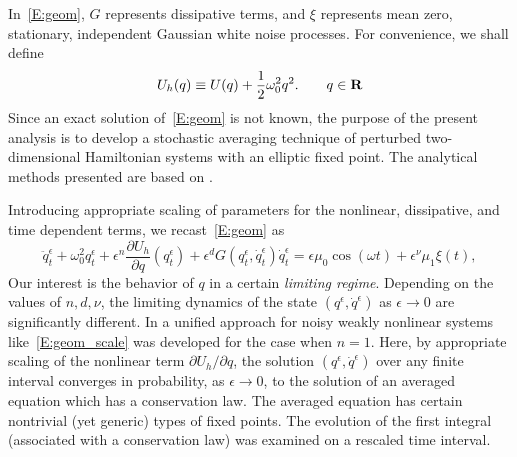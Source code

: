 In~\eqref{E:geom}, $G$ represents dissipative terms, and $\xi$ represents mean zero, stationary, independent Gaussian white noise processes. For convenience, we shall define
\[
U_h(q) \equiv U(q) + \frac12 \omega_0^2 q^2. \qquad q \in \mathbf R
\]
Since an exact solution of~\eqref{E:geom} is not known, the purpose of the present analysis is to develop a stochastic averaging technique of perturbed two-dimensional Hamiltonian systems with an elliptic fixed point. The analytical methods presented are based on \citet{freidlin98:_random_pertur_nonlin_oscil, namachchivaya01:_unified_approac_noisy_nonlin_mathieu_type_system, namachchivaya02:_rigor_stoch_averag_center_addit_noise, sowers03:_stoch_averag_near_homoc_orbit}.

Introducing appropriate scaling of parameters for the nonlinear, dissipative, and time dependent terms, we recast~\eqref{E:geom} as
\begin{equation}
\ddot q_t^\epsilon + \omega_0^2 q_t^\epsilon + \epsilon^n \frac{\partial U_h}{\partial q}(q_t^\epsilon) + \epsilon^d G(q_t^\epsilon,\dot q_t^\epsilon) \dot q_t^\epsilon = \epsilon \mu_0 \cos(\omega t) + \epsilon^\nu \mu_1 \xi(t),
\label{E:geom_scale}
\end{equation}
Our interest is the behavior of $q$ in a certain \emph{limiting regime}. Depending on the values of $n,d,\nu$, the limiting dynamics of the state $(q^\epsilon,\dot q^\epsilon)$ as $\epsilon \to 0$ are significantly different. In \citet{namachchivaya01:_unified_approac_noisy_nonlin_mathieu_type_system} a unified approach for noisy weakly nonlinear systems like~\eqref{E:geom_scale} was developed for the case when $n=1$. Here, by appropriate scaling of the nonlinear term $\partial U_h/\partial q$, the solution $(q^\epsilon,\dot q^\epsilon)$ over any finite interval converges in probability, as $\epsilon \to 0$, to the solution of an averaged equation which has a conservation law. The averaged equation has certain nontrivial (yet generic) types of fixed points. The evolution of the first integral (associated with a conservation law) was examined on a rescaled time interval.

